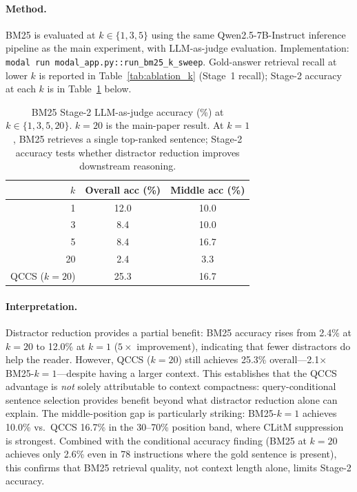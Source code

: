 \documentclass{article}
\begin{document}
\paragraph{Method.}
BM25 is evaluated at $k \in \{1, 3, 5\}$ using the same Qwen2.5-7B-Instruct inference
pipeline as the main experiment, with LLM-as-judge evaluation. Implementation:
\texttt{modal run modal\_app.py::run\_bm25\_k\_sweep}. Gold-answer retrieval recall at
lower $k$ is reported in Table~\ref{tab:ablation_k} (Stage~1 recall);
Stage-2 accuracy at each $k$ is in Table~\ref{tab:ksweep} below.

\begin{table}[H]
\centering
\caption{BM25 Stage-2 LLM-as-judge accuracy (\%) at $k \in \{1,3,5,20\}$.
  $k{=}20$ is the main-paper result. At $k{=}1$, BM25 retrieves a single
  top-ranked sentence; Stage-2 accuracy tests whether distractor reduction improves
  downstream reasoning.}
\label{tab:ksweep}
\small
\begin{tabular}{@{}rcc@{}}
\toprule
$k$ & Overall acc (\%) & Middle acc (\%) \\
\midrule
1 & 12.0 & 10.0 \\
3 &  8.4 & 10.0 \\
5 &  8.4 & 16.7 \\
20 & 2.4 & 3.3 \\
QCCS ($k{=}20$) & 25.3 & 16.7 \\
\bottomrule
\end{tabular}
\end{table}

\paragraph{Interpretation.}
Distractor reduction provides a partial benefit: BM25 accuracy rises from 2.4\%
at $k{=}20$ to 12.0\% at $k{=}1$ ($5\times$ improvement), indicating that fewer
distractors do help the reader. However, QCCS ($k{=}20$) still achieves 25.3\%
overall---2.1$\times$ BM25-$k{=}1$---despite having a larger context. This
establishes that the QCCS advantage is \emph{not} solely attributable to context
compactness: query-conditional sentence selection provides benefit beyond what
distractor reduction alone can explain. The middle-position gap is particularly
striking: BM25-$k{=}1$ achieves 10.0\% vs.\ QCCS 16.7\% in the 30--70\%
position band, where CLitM suppression is strongest. Combined with the conditional
accuracy finding (BM25 at $k{=}20$ achieves only 2.6\% even in 78 instructions
where the gold sentence is present), this confirms that BM25 retrieval quality,
not context length alone, limits Stage-2 accuracy.
\end{document}
